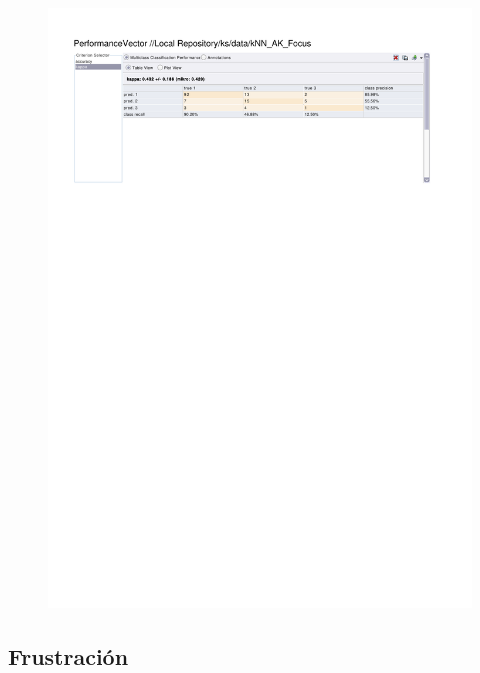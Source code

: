 \begin{figure}[htp]
  \centerline{\includegraphics[trim=0 680 0 60,clip,width=16.09cm]{results/kNN_K_Focus.pdf}} \caption{
} \label{kNN_K_Focus}
\end{figure}

\clearpage
\FloatBarrier
\subsection{Frustración}

